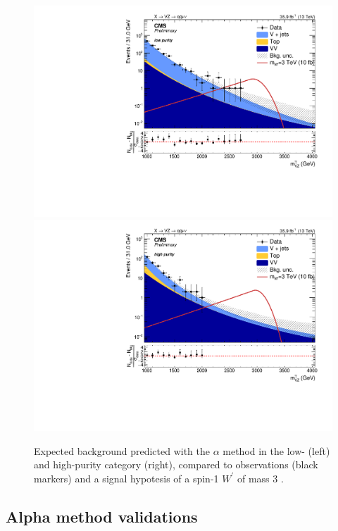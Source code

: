 \begin{figure}[!htb]
  \centering
    \includegraphics[width=.495\textwidth]{figures/XVZnnlp_XWZInv_BkgSR.pdf}
    \includegraphics[width=.495\textwidth]{figures/XVZnnhp_XWZInv_BkgSR.pdf}
  \caption{Expected background predicted with the $\alpha$ method in the low- (left) and high-purity category (right), compared to observations (black markers) and a signal hypotesis of a spin-1 $W^{'}$ of mass 3 \TeV.}
  \label{fig:XVZnn_Exp}
\end{figure}


\subsection{Alpha method validations}
\label{ssec:alpha_validation}


